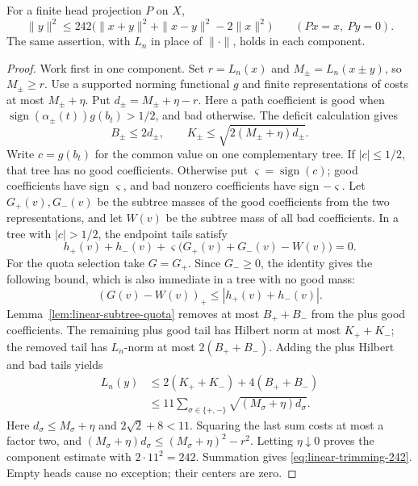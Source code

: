 \begin{theorem}
\label{thm:linear-trimming-242}
For a finite head projection \(P\) on \(X\),
\begin{equation}\label{eq:linear-trimming-242}
 \|y\|^2\le242\bigl(\|x+y\|^2+\|x-y\|^2-2\|x\|^2\bigr)
 \qquad(Px=x,\ Py=0).
\end{equation}
The same assertion, with \(L_n\) in place of \(\|\cdot\|\), holds in
each component.
\end{theorem}
\begin{proof}
Work first in one component. Set \(r=L_n(x)\) and
\(M_\pm=L_n(x\pm y)\), so \(M_\pm\ge r\). Use a supported norming
functional \(g\) and finite representations of costs at most
\(M_\pm+\eta\). Put \(d_\pm=M_\pm+\eta-r\). Here a path coefficient
is good when \(\operatorname{sign}(\alpha_\pm(t))g(b_t)>1/2\), and bad
otherwise. The deficit calculation gives
\begin{equation}\label{eq:linear-quota-deficits}
 B_\pm\le2d_\pm,\qquad
 K_\pm\le\sqrt{2(M_\pm+\eta)d_\pm}.
\end{equation}
Write \(c=g(b_t)\) for the common value on one complementary tree.
If \(|c|\le1/2\), that tree has no good coefficients. Otherwise put
\(\varsigma=\operatorname{sign}(c)\); good coefficients have sign
\(\varsigma\), and bad nonzero coefficients have sign \(-\varsigma\).
Let \(G_+(v),G_-(v)\) be the subtree masses of the good coefficients
from the two representations, and let \(W(v)\) be the subtree mass of
all bad coefficients. In a tree with \(|c|>1/2\), the endpoint tails satisfy
\[
 h_+(v)+h_-(v)+\varsigma\bigl(G_+(v)+G_-(v)-W(v)\bigr)=0.
\]
For the quota selection take \(G=G_+\). Since \(G_-\ge0\), the identity
gives the following bound, which is also immediate in a tree with no good mass:
\[
 (G(v)-W(v))_+\le|h_+(v)+h_-(v)|.
\]
Lemma~\ref{lem:linear-subtree-quota} removes at most \(B_++B_-\)
from the plus good coefficients. The remaining plus good tail has
Hilbert norm at most \(K_++K_-\); the removed tail has \(L_n\)-norm
at most \(2(B_++B_-)\). Adding the plus Hilbert and bad tails yields
\[
 \begin{split}
 L_n(y)&\le2(K_++K_-)+4(B_++B_-)\\
 &\le11\sum_{\sigma\in\{+,-\}}
             \sqrt{(M_\sigma+\eta)d_\sigma}.
 \end{split}
\]
Here \(d_\sigma\le M_\sigma+\eta\) and
\(2\sqrt2+8<11\). Squaring the last sum costs at most a factor two,
and
\((M_\sigma+\eta)d_\sigma\le(M_\sigma+\eta)^2-r^2\).
Letting \(\eta\downarrow0\) proves the component estimate with
\(2\cdot11^2=242\). Summation gives
\eqref{eq:linear-trimming-242}. Empty heads cause no exception; their
centers are zero.
\end{proof}


